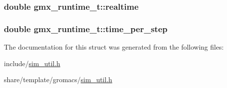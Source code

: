 \hypertarget{structgmx__runtime__t_a082ae54813da58b728f7fdc375dca17c}{
\subsubsection[{realtime}]{\setlength{\rightskip}{0pt plus 5cm}double {\bf gmx\-\_\-runtime\-\_\-t\-::realtime}}}\label{structgmx__runtime__t_a082ae54813da58b728f7fdc375dca17c}
\hypertarget{structgmx__runtime__t_a695d4ed072d42593e9415f0b46983639}{
\subsubsection[{time\-\_\-per\-\_\-step}]{\setlength{\rightskip}{0pt plus 5cm}double {\bf gmx\-\_\-runtime\-\_\-t\-::time\-\_\-per\-\_\-step}}}\label{structgmx__runtime__t_a695d4ed072d42593e9415f0b46983639}


\-The documentation for this struct was generated from the following files\-:\begin{DoxyCompactItemize}
\item 
include/\hyperlink{include_2sim__util_8h}{sim\-\_\-util.\-h}\item 
share/template/gromacs/\hyperlink{share_2template_2gromacs_2sim__util_8h}{sim\-\_\-util.\-h}\end{DoxyCompactItemize}

